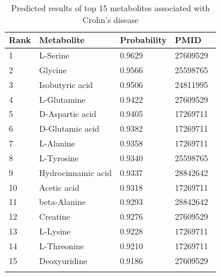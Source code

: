 \documentclass[lettersize,journal]{IEEEtran}
\begin{document}
\begin{table}[h]
	\centering
	\vspace{-3mm} %
	\caption{Predicted results of top 15 metabolites associated with Crohn's disease}
	\begin{tabular}{llll}
		\toprule
		Rank & Metabolite & Probability & PMID \\ 
		\midrule

		1&	L-Serine&	0.9629&	27609529 \\
		2&	Glycine&	0.9566&	25598765 \\
		3&	Isobutyric acid&0.9506& 24811995 \\
        4&	L-Glutamine&	0.9422&	27609529 \\
		5&	D-Aspartic acid&	0.9405&	17269711 \\
		6&	D-Glutamic acid&	0.9382&	17269711 \\
		7&	L-Alanine&	0.9358&	17269711 \\
		8&	L-Tyrosine&	0.9340&	25598765 \\
		9&	Hydrocinnamic acid&	0.9337&	28842642 \\
		10&	Acetic acid&	0.9318&	17269711 \\
		11&	beta-Alanine&	0.9293&	28842642 \\
		12&	Creatine&	0.9276&	27609529 \\
		13&	L-Lysine&	0.9228&	17269711 \\
		14&	L-Threonine&	0.9210&	17269711 \\
		15&	Deoxyuridine&	0.9186&	27609529 \\
		
		\bottomrule
		\vspace{-5mm} %
		\label{table4}
	\end{tabular}
\end{table}
\end{document}
